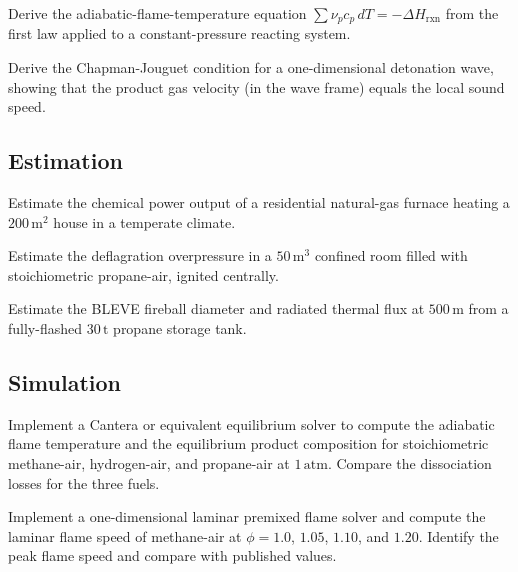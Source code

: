 \begin{exercise}
Derive the adiabatic-flame-temperature equation $\sum \nu_p c_p
\,dT = -\Delta H_{\text{rxn}}$ from the first law applied to a
constant-pressure reacting system.
\end{exercise}

\begin{exercise}
Derive the Chapman-Jouguet condition for a one-dimensional
detonation wave, showing that the product gas velocity (in the
wave frame) equals the local sound speed.
\end{exercise}

\subsection*{Estimation}

\begin{exercise}
Estimate the chemical power output of a residential natural-gas
furnace heating a $200\,\text{m}^2$ house in a temperate climate.
\end{exercise}

\begin{exercise}
Estimate the deflagration overpressure in a $50\,\text{m}^3$ confined
room filled with stoichiometric propane-air, ignited centrally.
\end{exercise}

\begin{exercise}
Estimate the BLEVE fireball diameter and radiated thermal flux at
$500\,\text{m}$ from a fully-flashed $30\,\text{t}$ propane storage
tank.
\end{exercise}

\subsection*{Simulation}

\begin{exercise}
Implement a Cantera or equivalent equilibrium solver to compute the
adiabatic flame temperature and the equilibrium product composition
for stoichiometric methane-air, hydrogen-air, and propane-air at
$1\,\text{atm}$. Compare the dissociation losses for the three
fuels.
\end{exercise}

\begin{exercise}
Implement a one-dimensional laminar premixed flame solver and
compute the laminar flame speed of methane-air at $\phi = 1.0$,
$1.05$, $1.10$, and $1.20$. Identify the peak flame speed and
compare with published values.
\end{exercise}

